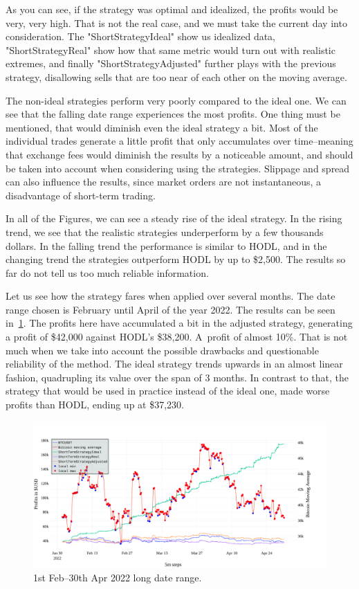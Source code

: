 As you can see, if the strategy was optimal and idealized, the profits would be very, very high. That is not the real case, and we must take the current day into consideration. The "ShortStrategyIdeal" show us idealized data, "ShortStrategyReal" show how that same metric would turn out with realistic extremes, and finally "ShortStrategyAdjusted" further plays with the previous strategy, disallowing sells that are too near of each other on the moving average.

The non-ideal strategies perform very poorly compared to the ideal one. We can see that the falling date range experiences the most profits. One thing must be mentioned, that would diminish even the ideal strategy a bit. Most of the individual trades generate a little profit that only accumulates over time--meaning that exchange fees would diminish the results by a noticeable amount, and should be taken into account when considering using the strategies. Slippage and spread can also influence the results, since market orders are not instantaneous, a disadvantage of short-term trading.

In all of the Figures, we can see a steady rise of the ideal strategy. In the rising trend, we see that the realistic strategies underperform by a few thousands dollars. In the falling trend the performance is similar to HODL, and in the changing trend the strategies outperform HODL by up to \$2,500. The results so far do not tell us too much reliable information.

Let us see how the strategy fares when applied over several months. The date range chosen is February until April of the year 2022. The results can be seen in~\ref{figure-short-term-long}. The profits here have accumulated a bit in the adjusted strategy, generating a profit of \$42,000 against HODL's \$38,200. A~profit of almost 10\%. That is not much when we take into account the possible drawbacks and questionable reliability of the method. The ideal strategy trends upwards in an almost linear fashion, quadrupling its value over the span of 3 months. In contrast to that, the strategy that would be used in practice instead of the ideal one, made worse profits than HODL, ending up at \$37,230.

\begin{figure}[!t]
    \centering
    \includegraphics[width=\columnwidth]{figures/short-term-long.pdf}
    \caption{1st Feb--30th Apr 2022 long date range.}
    \label{figure-short-term-long}
\end{figure}

